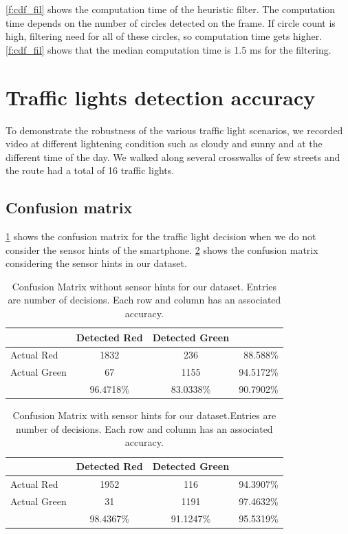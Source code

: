\ref{f:cdf_fil} shows the computation time of the heuristic filter.
The computation time depends on the number of circles detected on the frame.
If circle count is high, filtering need for all of these circles, so computation time gets higher.
\ref{f:cdf_fil} shows that the median computation time is 1.5 ms for the filtering. 





\section{Traffic lights detection accuracy}
\label{s:acc}
To demonstrate the robustness of the various traffic light scenarios, we recorded video at different lightening condition such as cloudy and sunny and at the different time of the day.
We walked along several crosswalks of few streets and the route had a total of 16 traffic lights.

\subsection{Confusion matrix}
\ref{t:con_nocrp} shows the confusion matrix for the traffic light decision when we do not consider the sensor hints of the smartphone.
\ref{t:con_crp} shows the confusion matrix considering the sensor hints in our dataset.

\begin{table}[ht!]
  \centering
  \caption{Confusion Matrix without sensor hints for our dataset. Entries are number of decisions. Each row and column has an associated accuracy.}
  \label{t:con_nocrp}
  \begin{tabular}{  l | c | c | r }
   
     & Detected Red & Detected Green &  \\
    \hline
    Actual Red & 1832 & 236 & 88.588\% \\
    \hline
    Actual Green & 67 & 1155 & 94.5172\% \\
    \hline
    & 96.4718\% & 83.0338\% & 90.7902\% \\
    
  \end{tabular}
\end{table}

\begin{table}[ht!]
  \centering
  \caption{Confusion Matrix with sensor hints for our  dataset.Entries are number of decisions. Each row and column has an associated accuracy.}
  \label{t:con_crp}
  \begin{tabular}{  l | c | c | r }
   
     & Detected Red & Detected Green &  \\
    \hline
    Actual Red & 1952 & 116 & 94.3907\% \\
    \hline
    Actual Green & 31 & 1191 & 97.4632\% \\
    \hline
    & 98.4367\% & 91.1247\% & 95.5319\% \\
    
  \end{tabular}
\end{table}

